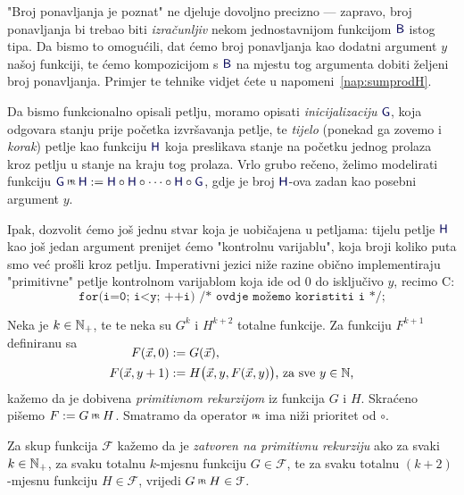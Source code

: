 "Broj ponavljanja je poznat" ne djeluje dovoljno precizno --- zapravo, broj ponavljanja bi trebao biti \emph{izračunljiv} nekom jednostavnijom funkcijom $\f B$ istog tipa. 
Da bismo to omogućili, dat ćemo broj ponavljanja kao dodatni argument $y$ našoj funkciji, te ćemo kompozicijom s $\f B$ na mjestu tog argumenta dobiti željeni broj ponavljanja. Primjer te tehnike vidjet ćete u napomeni~\ref{nap:sumprodH}.

Da bismo funkcionalno opisali petlju, moramo opisati \emph{inicijalizaciju} $\f G$, koja odgovara stanju prije početka izvršavanja petlje, te \emph{tijelo} (ponekad ga zovemo i \emph{korak}) petlje kao funkciju $\f H$ koja preslikava stanje na početku jednog prolaza kroz petlju u stanje na kraju tog prolaza. Vrlo grubo rečeno, želimo modelirati funkciju $\f G\pr\f H:=\f H\circ\f H\circ\dotsb\circ\f  H\circ\f G$, gdje je broj $\f H$-ova zadan kao posebni argument $y$.

Ipak, dozvolit ćemo još jednu stvar koja je uobičajena u petljama: tijelu petlje $\f H$ kao još jedan argument prenijet ćemo "kontrolnu varijablu", koja broji koliko puta smo već prošli kroz petlju. Imperativni jezici niže razine obično implementiraju "primitivne" petlje kontrolnom varijablom koja ide od $0$ do isključivo $y$, recimo C:
\begin{equation}\label{prog:Cprloop}
\texttt{for(i=0; i<y; ++i) /* ovdje možemo koristiti i */;}
\end{equation}


\begin{definicija}\label{def:pr}
Neka je $k\in{\mathbb N}_+$, te te neka su $G^k$ i $H^{k+2}$ totalne funkcije. Za funkciju $F^{k+1}$ definiranu sa
\begin{align}
\SwapAboveDisplaySkip
\label{eq:defprb}
F(\vec x,0)&:=G(\vec x)\text,\\
\label{eq:defprk}
F(\vec x,y+1)&:=H\bigl(\vec x,y,F(\vec x,y)\bigr)\text{, za sve $y\in\N$,}
\end{align}
kažemo da je dobivena \emph{primitivnom rekurzijom} iz funkcija $G$ i $H$. Skraćeno pišemo $F:=G\pr H$. Smatramo da operator $\pr$ ima niži prioritet od $\circ$.

Za skup funkcija $\mathcal F$ kažemo da je \emph{zatvoren na primitivnu rekurziju} ako za svaki $k\in{\mathbb N}_+$, za svaku totalnu $k$-mjesnu funkciju $G\in\mathcal F$, te za svaku totalnu $(k+2)$-mjesnu funkciju $H\in\mathcal F$, vrijedi $G\pr H\in\mathcal F$.
\end{definicija}

